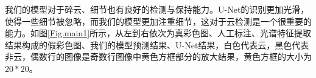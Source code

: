 \documentclass[10pt]{ctexart}
\begin{document}
\begin{multicols}{2}

我们的模型对于碎云、细节也有良好的检测与保持能力。U-Net的识别更加光滑，使得一些细节被忽略，而我们的模型更加注重细节，这对于云检测是一个很重要的能力。如图\ref{Fig.main1}所示，从左到右依次为真彩色图、人工标注、光谱特征提取结果构成的假彩色图、我们的模型预测结果、U-Net结果，白色代表云，黑色代表非云，偶数行的图像是奇数行图像中黄色方框部分的放大结果，黄色方框的大小为$20*20$。

\end{multicols}

\begin{figure}[H]
    \centering
\end{figure}
\end{document}
